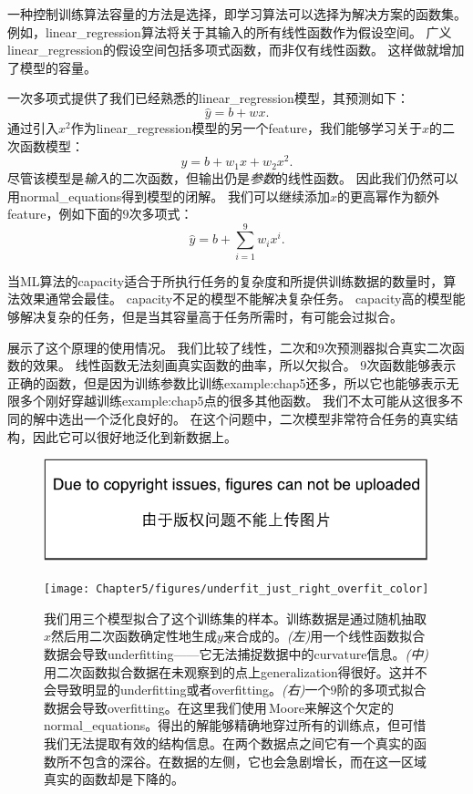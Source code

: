一种控制训练算法容量的方法是选择，即学习算法可以选择为解决方案的函数集。
例如，\gls{linear_regression}算法将关于其输入的所有线性函数作为假设空间。
广义\gls{linear_regression}的假设空间包括多项式函数，而非仅有线性函数。
这样做就增加了模型的容量。

一次多项式提供了我们已经熟悉的\gls{linear_regression}模型，其预测如下：
\begin{equation}
    \hat{y} = b + wx.
\end{equation}
通过引入$x^2$作为\gls{linear_regression}模型的另一个\gls{feature}，我们能够学习关于$x$的二次函数模型：
\begin{equation}
    \hat{y} = b + w_1x + w_2x^2.
\end{equation}
尽管该模型是\emph{输入}的二次函数，但输出仍是\emph{参数}的线性函数。
因此我们仍然可以用\gls{normal_equations}得到模型的闭解。
我们可以继续添加$x$的更高幂作为额外\gls{feature}，例如下面的$9$次多项式：
\begin{equation}
    \hat{y} = b + \sum_{i=1}^9 w_i x^i.
\end{equation}

当\gls{ML}算法的\gls{capacity}适合于所执行任务的复杂度和所提供训练数据的数量时，算法效果通常会最佳。
\gls{capacity}不足的模型不能解决复杂任务。
\gls{capacity}高的模型能够解决复杂的任务，但是当其容量高于任务所需时，有可能会过拟合。

展示了这个原理的使用情况。
我们比较了线性，二次和$9$次预测器拟合真实二次函数的效果。
线性函数无法刻画真实函数的曲率，所以欠拟合。
$9$次函数能够表示正确的函数，但是因为训练参数比训练\gls{example:chap5}还多，所以它也能够表示无限多个刚好穿越训练\gls{example:chap5}点的很多其他函数。
我们不太可能从这很多不同的解中选出一个泛化良好的。
在这个问题中，二次模型非常符合任务的真实结构，因此它可以很好地泛化到新数据上。

\begin{figure}[!htb]
\ifOpenSource
\centerline{\includegraphics{figure.pdf}}
\else
\centerline{\texttt{[image: Chapter5/figures/underfit\_just\_right\_overfit\_color]}}
\fi
\caption{我们用三个模型拟合了这个训练集的样本。训练数据是通过随机抽取$x$然后用二次函数确定性地生成$y$来合成的。\emph{(左)}用一个线性函数拟合数据会导致\gls{underfitting}——它无法捕捉数据中的\gls{curvature}信息。\emph{(中)}用二次函数拟合数据在未观察到的点上\gls{generalization}得很好。这并不会导致明显的\gls{underfitting}或者\gls{overfitting}。\emph{(右)}一个$9$阶的多项式拟合数据会导致\gls{overfitting}。在这里我们使用\,\gls{Moore}来解这个欠定的\gls{normal_equations}。得出的解能够精确地穿过所有的训练点，但可惜我们无法提取有效的结构信息。在两个数据点之间它有一个真实的函数所不包含的深谷。在数据的左侧，它也会急剧增长，而在这一区域真实的函数却是下降的。}
\label{fig:chap5_underfit_just_right_overfit}
\end{figure}

